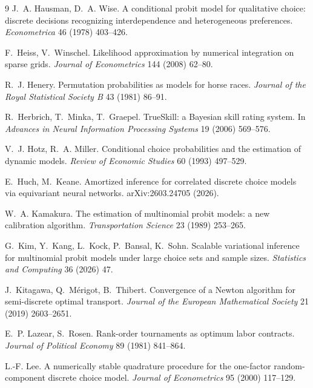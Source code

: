\documentclass[12pt]{article}
\theoremstyle{remark}
\begin{document}
\begin{thebibliography}{9}
 J.~A. Hausman, D.~A.
Wise. A conditional probit model for qualitative choice: discrete
decisions recognizing interdependence and heterogeneous preferences.
\emph{Econometrica} 46 (1978) 403--426.

 F.~Heiss, V.~Winschel.
Likelihood approximation by numerical integration on sparse grids.
\emph{Journal of Econometrics} 144 (2008) 62--80.

 R.~J. Henery. Permutation
probabilities as models for horse races. \emph{Journal of the Royal
Statistical Society B} 43 (1981) 86--91.

 R.~Herbrich, T.~Minka, T.~Graepel. TrueSkill: a
Bayesian skill rating system. In \emph{Advances in Neural Information
Processing Systems} 19 (2006) 569--576.

 V.~J. Hotz, R.~A. Miller. Conditional choice
probabilities and the estimation of dynamic models. \emph{Review of
Economic Studies} 60 (1993) 497--529.

 E.~Huch, M.~Keane. Amortized inference for correlated
discrete choice models via equivariant neural networks. arXiv:2603.24705
(2026).

 W.~A. Kamakura. The estimation
of multinomial probit models: a new calibration algorithm.
\emph{Transportation Science} 23 (1989) 253--265.

G.~Kim, Y.~Kang, L.~Kock, P.~Bansal, K.~Sohn. Scalable variational
inference for multinomial probit models under large choice sets and
sample sizes. \emph{Statistics and Computing} 36 (2026) 47.

 J.~Kitagawa, Q.~M\'erigot, B.~Thibert. Convergence of
a Newton algorithm for semi-discrete optimal transport. \emph{Journal
of the European Mathematical Society} 21 (2019) 2603--2651.

 E.~P. Lazear, S.~Rosen.
Rank-order tournaments as optimum labor contracts. \emph{Journal of
Political Economy} 89 (1981) 841--864.

 L.-F. Lee. A numerically stable quadrature
procedure for the one-factor random-component discrete choice model.
\emph{Journal of Econometrics} 95 (2000) 117--129.


\end{thebibliography}
\end{document}
